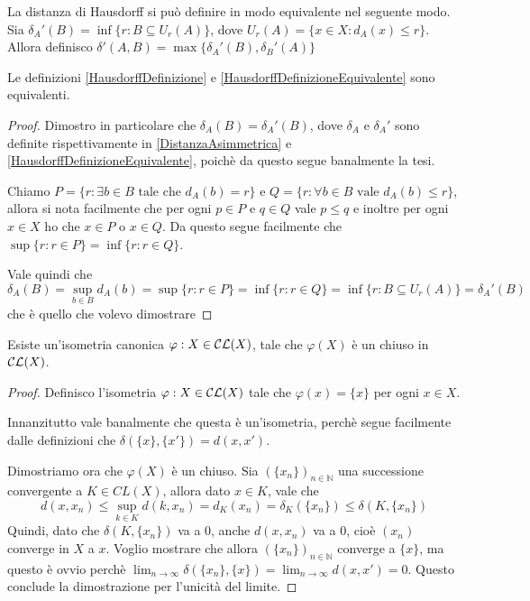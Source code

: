 \begin{definition} \label{HausdorffDefinizioneEquivalente}
	La distanza di Hausdorff si può definire in modo equivalente nel seguente modo. Sia $\delta_A'(B)=\inf\{r:B\subseteq U_r(A)\}$, dove $U_r(A)=\{x\in X : d_A(x)\le r \}$. Allora definisco $\delta'(A,B)=\max\{\delta_A'(B),\delta_B'(A)\}$
\end{definition}

\begin{theorem}
	Le definizioni \cref{HausdorffDefinizione} e \cref{HausdorffDefinizioneEquivalente} sono equivalenti.
\end{theorem}
\begin{proof}
	Dimostro in particolare che $\delta_A(B)=\delta_A'(B)$, dove $\delta_A$ e $\delta_A'$ sono definite rispettivamente in \cref{DistanzaAsimmetrica} e \cref{HausdorffDefinizioneEquivalente}, poichè da questo segue banalmente la tesi.
	
	Chiamo $P=\{ r : \exists b\in B \text{ tale che }d_A(b)=r \}$ e $Q=\{ r: \forall b\in B\text{ vale } d_A(b)\le r \}$, allora si nota facilmente che per ogni $p\in P$ e $q\in Q$ vale $p\le q$ e inoltre per ogni $x\in X$ ho che $x\in P$ o $x\in Q$. Da questo segue facilmente che $\sup\{ r: r\in P \}=\inf\{r: r\in Q \}$.
	
	Vale quindi che
	\begin{equation*}
		\delta_A(B)=\sup_{b\in B} d_A(b)=\sup\{ r : r\in P \}=\inf\{ r : r\in Q \}= \inf\{ r : B\subseteq U_r(A) \}=\delta_A'(B)
	\end{equation*}
	che è quello che volevo dimostrare
\end{proof}

\begin{lemma}\label{IsometriaCanonica}
	Esiste un'isometria canonica $\varphi: X\in \mathcal{CL}(X)$, tale che $\varphi(X)$ è un chiuso in $\mathcal{CL}(X)$.
\end{lemma}
\begin{proof}
	Definisco l'isometria $\varphi: X\in\mathcal{CL}(X)$ tale che $\varphi(x)=\{x\}$ per ogni $x\in X$. 
	
	Innanzitutto vale banalmente che questa è un'isometria, perchè segue facilmente dalle definizioni che $\delta(\{ x \}, \{ x' \})=d(x,x')$.
	
	Dimostriamo ora che $\varphi(X)$ è un chiuso. Sia $(\{ x_n \})_{n\in \mathbb{N}}$ una successione convergente a $K\in CL(X)$, allora dato $x\in K$, vale che
	\begin{equation*}
		d(x,x_n)\le \sup_{k\in K} d(k,x_n)=d_K(x_n)=\delta_K(\{x_n\})\le \delta(K,\{x_n \})
	\end{equation*}
	Quindi, dato che $\delta(K,\{x_n \})$ va a 0, anche $d(x,x_n)$ va a 0, cioè $(x_n)$ converge in $X$ a $x$. Voglio mostrare che allora $(\{ x_n \})_{n\in \mathbb{N}}$ converge a $\{ x \}$, ma questo è ovvio perchè $\lim_{n\to\infty} \delta(\{ x_n \}, \{x\})=\lim_{n\to\infty} d(x,x')=0$. Questo conclude la dimostrazione per l'unicità del limite.
\end{proof}









